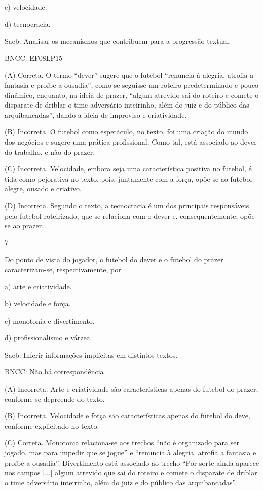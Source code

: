 c) velocidade.

d) tecnocracia.

Saeb: Analisar os mecanismos que contribuem para a progressão textual.

BNCC: EF08LP15

(A) Correta. O termo ``dever'' sugere que o futebol ``renuncia à
alegria, atrofia a fantasia e proíbe a ousadia'', como se seguisse um
roteiro predeterminado e pouco dinâmico, enquanto, na ideia de prazer,
``algum atrevido sai do roteiro e comete o disparate de driblar o time
adversário inteirinho, além do juiz e do público das arquibancadas'',
dando a ideia de improviso e criatividade.

(B) Incorreta. O futebol como espetáculo, no texto, foi uma criação do
mundo dos negócios e sugere uma prática profissional. Como tal, está
associado ao dever do trabalho, e não do prazer.

(C) Incorreta. Velocidade, embora seja uma característica positiva no
futebol, é tida como pejorativa no texto, pois, juntamente com a força,
opõe-se ao futebol alegre, ousado e criativo.

(D) Incorreta. Segundo o texto, a tecnocracia é um dos principais
responsáveis pelo futebol roteirizado, que se relaciona com o dever e,
consequentemente, opõe-se ao prazer.

\num{7}

Do ponto de vista do jogador, o futebol do dever e o futebol do prazer
caracterizam-se, respectivamente, por

a) arte e criatividade.

b) velocidade e força.

c) monotonia e divertimento.

d) profissionalismo e várzea.

Saeb: Inferir informações implícitas em distintos textos.

BNCC: Não há correspondência

(A) Incorreta. Arte e criatividade são características apenas do futebol
do prazer, conforme se depreende do texto.

(B) Incorreta. Velocidade e força são características apenas do futebol
do deve, conforme explicitado no texto.

(C) Correta. Monotonia relaciona-se aos trechos ``não é organizado para
ser jogado, mas para impedir que se jogue'' e ``renuncia à alegria,
atrofia a fantasia e proíbe a ousadia''. Divertimento está associado ao
trecho ``Por sorte ainda aparece nos campos {[}...{]} algum atrevido que
sai do roteiro e comete o disparate de driblar o time adversário
inteirinho, além do juiz e do público das arquibancadas''.

